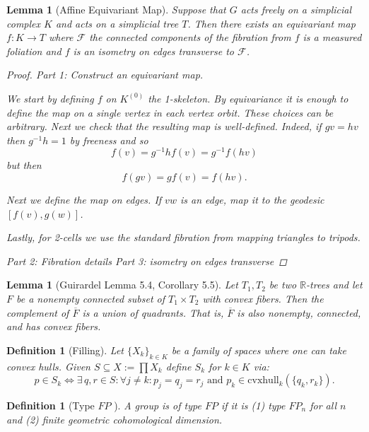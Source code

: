 \documentclass{article}
\theoremstyle{mystyle}
\newtheorem{lem}[thm]{Lemma}
\newtheorem{defn}[thm]{Definition}
\theoremstyle{remark}
\begin{document}
\begin{lem}
    [Affine Equivariant Map]
    \label{lem:affineequivariantmap} 
    Suppose that \(G\) acts freely on a simplicial complex \(K\) and acts on a simplicial tree \(T\). Then there exists an equivariant map \(f: K \to T\) where \(\mathscr{F}\) the connected components of the fibration from \(f\) is a measured foliation and \(f\) is an isometry on edges transverse to \(\mathscr{F}\).
    \begin{proof}
        Part 1: Construct an equivariant map.

        We start by defining \(f\) on \(K^{(0)}\) the 1-skeleton. By equivariance it is enough to define the map on a single vertex in each vertex orbit. These choices can be arbitrary. Next we check that the resulting map is well-defined. Indeed, if \(gv=hv\) then \(g^{-1} h = 1\) by freeness and so \[ f(v)=g^{-1}h f(v)=g^{-1} f(hv) \] but then \[ f(gv)=gf(v)=f(hv).\] 
        
        Next we define the map on edges. If \(vw\) is an edge, map it to the geodesic \([f(v),g(w)]\). 
        
        Lastly, for 2-cells we use the standard fibration from mapping triangles to tripods.
        
        Part 2: Fibration details
        Part 3: isometry on edges transverse
    \end{proof}
\end{lem}
\begin{lem}
	[Guirardel Lemma 5.4, Corollary 5.5]
 \label{lem:guirardel} 
	Let \(T_{1} , T_{2}\) be two \(\mathbb{R}\)-trees and let \(F\) be a nonempty connected subset of \(T_{1} \times T_{2}\) with convex fibers. Then the complement of \(\overline{F}\) is a union of quadrants. That is, \(\overline{F}\) is also nonempty, connected, and has convex fibers.
\end{lem}

\begin{defn}
	[Filling]
    Let \(\{X_{k}\}_{k \in K}\) be a family of spaces where one can take convex hulls. Given \(S \subseteq X := \prod X_{k}\) define \(S_{k}\) for \(k \in K\) via: \[p \in S_{k} \iff \exists \,q,r \in S: \forall j \neq k: p_{j} = q_{j} = r_{j} \text{ and } p_{k} \in \text{cvxhull}_k (\{q_{k} , r_{k}\}).\] 
\end{defn}
\begin{defn}
	[Type \(FP\) ]
	A group is of type \(FP\) if it is (1) type \(FP_n\) for all \(n\) and (2) finite geometric cohomological dimension.
\end{defn}
\end{document}
